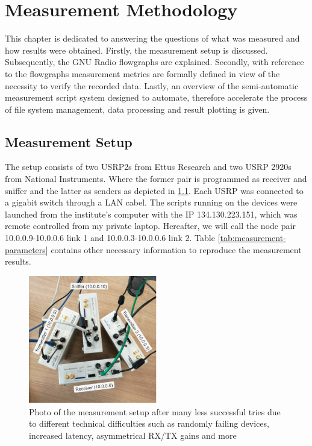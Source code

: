 \chapter{Measurement Methodology}

This chapter is dedicated to answering the questions of what was measured and how results were obtained. Firstly, the measurement setup is discussed. Subsequently,  the GNU Radio flowgraphs are explained. Secondly, with reference to the flowgraphs measurement metrics are formally defined in view of the necessity to verify the recorded data.  Lastly, an overview of the semi-automatic measurement script system designed to automate, therefore accelerate the process of file system management, data processing and result plotting is given.

\section{Measurement Setup}

The setup consists of two USRP2s from Ettus Research and two USRP 2920s from National Instruments. Where the former pair is programmed as receiver and sniffer and the latter  as senders as depicted in \ref{fig:measurement-setup}. Each USRP was connected to a gigabit switch through a LAN cabel. The scripts running on the devices were launched from the institute's computer with the IP 134.130.223.151, which was remote controlled from my private laptop. Hereafter, we will call the node pair 10.0.0.9-10.0.0.6 link 1 and 10.0.0.3-10.0.0.6 link 2. Table \ref{tab:measurement-parameters} contains other necessary information to reproduce the measurement results.

\begin{figure}[tb]
	\label{fig:measurement-setup}
	\begin{center}
		\includegraphics[width=0.5\textwidth]{pictures/measurement_setup}
	\end{center}
	\caption{Photo of the measurement setup after many less successful tries due to different technical difficulties such as randomly failing devices, increased latency, asymmetrical RX/TX gains and more}
\end{figure}

